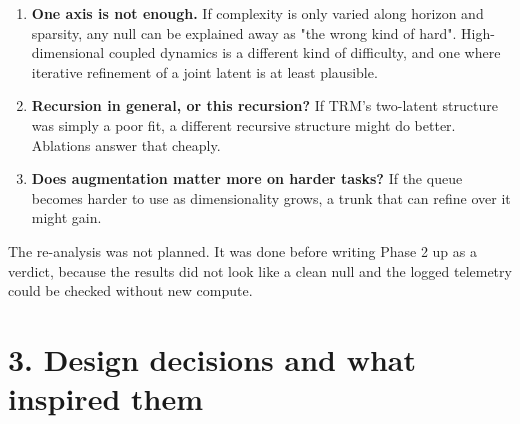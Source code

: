 \documentclass[11pt]{article}
\begin{document}
\begin{enumerate}
\item \textbf{One axis is not enough.} If complexity is only varied along horizon and sparsity, any null can be explained away as "the wrong kind of hard". High-dimensional coupled dynamics is a different kind of difficulty, and one where iterative refinement of a joint latent is at least plausible.
\item \textbf{Recursion in general, or this recursion?} If TRM's two-latent structure was simply a poor fit, a different recursive structure might do better. Ablations answer that cheaply.
\item \textbf{Does augmentation matter more on harder tasks?} If the queue becomes harder to use as dimensionality grows, a trunk that can refine over it might gain.
\end{enumerate}



The re-analysis was not planned. It was done before writing Phase 2 up as a verdict, because the results did not look like a clean null and the logged telemetry could be checked without new compute.



\section*{3. Design decisions and what inspired them}
\end{document}
